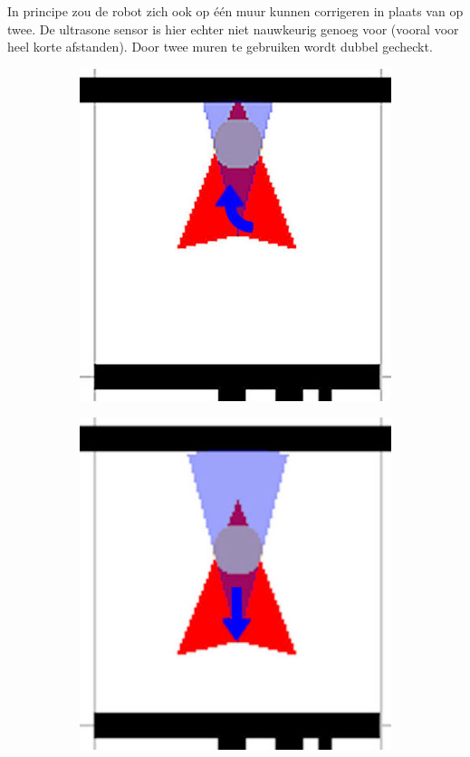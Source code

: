 \documentclass[eind]{penoverslag}
\begin{document}
In principe zou de robot zich ook op \'e\'en muur kunnen corrigeren in plaats van op twee. De ultrasone sensor is hier echter niet nauwkeurig genoeg voor (vooral voor heel korte afstanden). Door twee muren te gebruiken wordt dubbel gecheckt.

\begin{figure}
        \centering
        \begin{subfigure}[hb]{0.2\textwidth}
                \centering
                \includegraphics[width=\textwidth]{muur2}
        \end{subfigure}%
        \begin{subfigure}[hb]{0.2\textwidth}
                \centering
                \includegraphics[width=\textwidth]{muur3}

\end{subfigure}
\end{figure}
\end{document}
